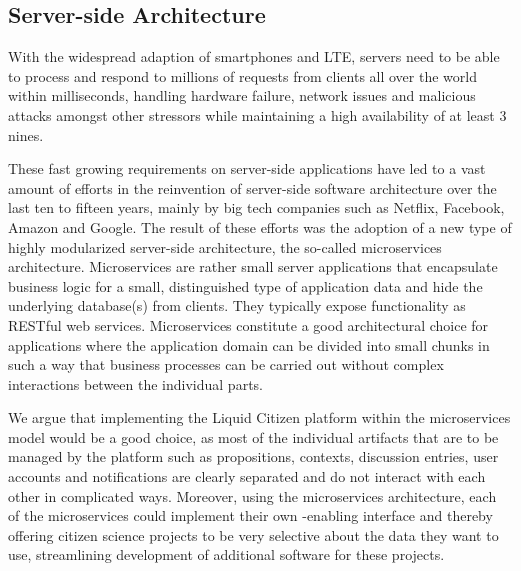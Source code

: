 \subsection{Server-side Architecture}
\label{ssec:ServerSideArchitecture}

With the widespread adaption of smartphones and LTE, servers need to be able to process and respond to millions of requests from clients all over the world within milliseconds, handling hardware failure, network issues and malicious attacks amongst other stressors while maintaining a high availability of at least 3 nines.

These fast growing requirements on server-side applications have led to a vast amount of efforts in the reinvention of server-side software architecture over the last ten to fifteen years, mainly by big tech companies such as Netflix, Facebook, Amazon and Google.
The result of these efforts was the adoption of a new type of highly modularized server-side architecture, the so-called microservices architecture.
Microservices are rather small server applications that encapsulate business logic for a small, distinguished type of application data and hide the underlying database(s) from clients.
They typically expose functionality as RESTful web services.
Microservices constitute a good architectural choice for applications where the application domain can be divided into small chunks in such a way that business processes can be carried out without complex interactions between the individual parts.

We argue that implementing the Liquid Citizen platform within the microservices model would be a good choice, as most of the individual artifacts that are to be managed by the platform such as propositions, contexts, discussion entries, user accounts and notifications are clearly separated and do not interact with each other in complicated ways.
Moreover, using the microservices architecture, each of the microservices could implement their own -enabling interface and thereby offering citizen science projects to be very selective about the data they want to use, streamlining development of additional software for these projects.

%



